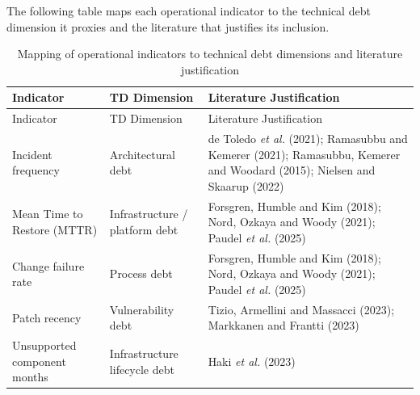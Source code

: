 \documentclass[
  12pt,
  letterpaper,
  12pt,
  oneside,
  english,
  onehalfspacing,
  headsepline]{MastersDoctoralThesis}
\begin{document}
The following table maps each operational indicator to the technical
debt dimension it proxies and the literature that justifies its
inclusion.

\begin{longtable}[]{@{}
  >{\raggedright\arraybackslash}p{}
  >{\raggedright\arraybackslash}p{}
  >{\raggedright\arraybackslash}p{}@{}}
\caption{Mapping of operational indicators to technical debt dimensions
and literature justification}\label{tbl-indicators-lit}\tabularnewline
\toprule\noalign{}
\begin{minipage}[b]{\linewidth}\raggedright
Indicator
\end{minipage} & \begin{minipage}[b]{\linewidth}\raggedright
TD Dimension
\end{minipage} & \begin{minipage}[b]{\linewidth}\raggedright
Literature Justification
\end{minipage} \\
\midrule\noalign{}
\endfirsthead
\toprule\noalign{}
\begin{minipage}[b]{\linewidth}\raggedright
Indicator
\end{minipage} & \begin{minipage}[b]{\linewidth}\raggedright
TD Dimension
\end{minipage} & \begin{minipage}[b]{\linewidth}\raggedright
Literature Justification
\end{minipage} \\
\midrule\noalign{}
\endhead
\bottomrule\noalign{}
\endlastfoot
Incident frequency & Architectural debt & de Toledo \emph{et al.}
(2021); Ramasubbu and Kemerer (2021); Ramasubbu, Kemerer and Woodard
(2015); Nielsen and Skaarup (2022) \\
Mean Time to Restore (MTTR) & Infrastructure / platform debt & Forsgren,
Humble and Kim (2018); Nord, Ozkaya and Woody (2021); Paudel \emph{et
al.} (2025) \\
Change failure rate & Process debt & Forsgren, Humble and Kim (2018);
Nord, Ozkaya and Woody (2021); Paudel \emph{et al.} (2025) \\
Patch recency & Vulnerability debt & Tizio, Armellini and Massacci
(2023); Markkanen and Frantti (2023) \\
Unsupported component months & Infrastructure lifecycle debt & Haki
\emph{et al.} (2023) \\
\end{longtable}
\end{document}
